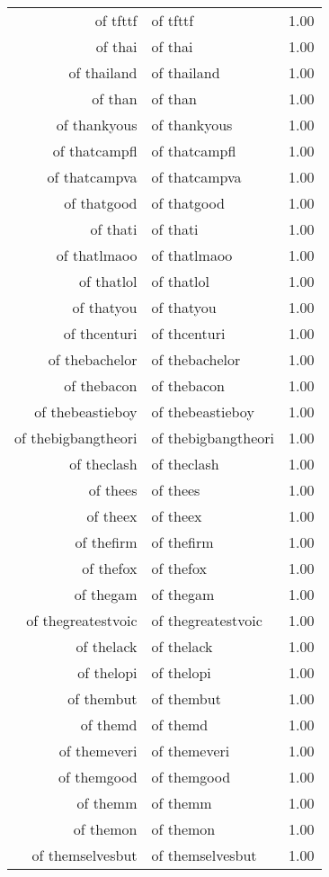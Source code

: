 \begin{table}[ht]
\begin{tabular}{rlr}
  of tfttf & of tfttf & 1.00 \\ 
  of thai & of thai & 1.00 \\ 
  of thailand & of thailand & 1.00 \\ 
  of than & of than & 1.00 \\ 
  of thankyous & of thankyous & 1.00 \\ 
  of thatcampfl & of thatcampfl & 1.00 \\ 
  of thatcampva & of thatcampva & 1.00 \\ 
  of thatgood & of thatgood & 1.00 \\ 
  of thati & of thati & 1.00 \\ 
  of thatlmaoo & of thatlmaoo & 1.00 \\ 
  of thatlol & of thatlol & 1.00 \\ 
  of thatyou & of thatyou & 1.00 \\ 
  of thcenturi & of thcenturi & 1.00 \\ 
  of thebachelor & of thebachelor & 1.00 \\ 
  of thebacon & of thebacon & 1.00 \\ 
  of thebeastieboy & of thebeastieboy & 1.00 \\ 
  of thebigbangtheori & of thebigbangtheori & 1.00 \\ 
  of theclash & of theclash & 1.00 \\ 
  of thees & of thees & 1.00 \\ 
  of theex & of theex & 1.00 \\ 
  of thefirm & of thefirm & 1.00 \\ 
  of thefox & of thefox & 1.00 \\ 
  of thegam & of thegam & 1.00 \\ 
  of thegreatestvoic & of thegreatestvoic & 1.00 \\ 
  of thelack & of thelack & 1.00 \\ 
  of thelopi & of thelopi & 1.00 \\ 
  of thembut & of thembut & 1.00 \\ 
  of themd & of themd & 1.00 \\ 
  of themeveri & of themeveri & 1.00 \\ 
  of themgood & of themgood & 1.00 \\ 
  of themm & of themm & 1.00 \\ 
  of themon & of themon & 1.00 \\ 
  of themselvesbut & of themselvesbut & 1.00 \\ 

\end{tabular}
\end{table}
